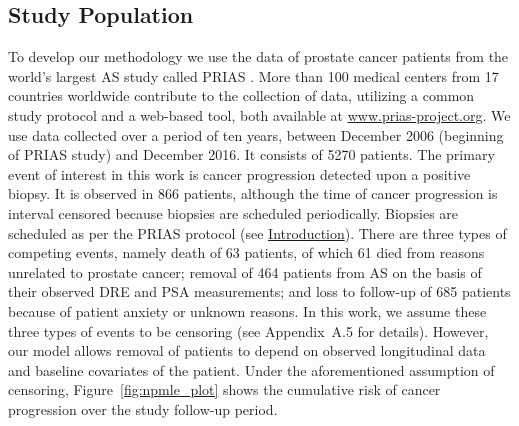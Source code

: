 
\subsection{Study Population}
\label{subsec:study_population}
To develop our methodology we use the data of prostate cancer patients from the world's largest AS study called PRIAS \cite{bokhorst2016decade}. More than 100 medical centers from 17 countries worldwide contribute to the collection of data, utilizing a common study protocol and a web-based tool, both available at \url{www.prias-project.org}. We use data collected over a period of ten years, between December 2006 (beginning of PRIAS study) and December 2016. It consists of 5270 patients. The primary event of interest in this work is cancer progression detected upon a positive biopsy. It is observed in 866 patients, although the time of cancer progression is interval censored because biopsies are scheduled periodically. Biopsies are scheduled as per the PRIAS protocol (see \hyperref[sec:introduction]{Introduction}). There are three types of competing events, namely death of 63 patients, of which 61 died from reasons unrelated to prostate cancer; removal of 464 patients from AS on the basis of their observed DRE and PSA measurements; and loss to follow-up of 685 patients because of patient anxiety or unknown reasons. In this work, we assume these three types of events to be censoring (see Appendix~A.5 for details). However, our model allows removal of patients to depend on observed longitudinal data and baseline covariates of the patient. Under the aforementioned assumption of censoring, Figure~\ref{fig:npmle_plot} shows the cumulative risk of cancer progression over the study follow-up period.

